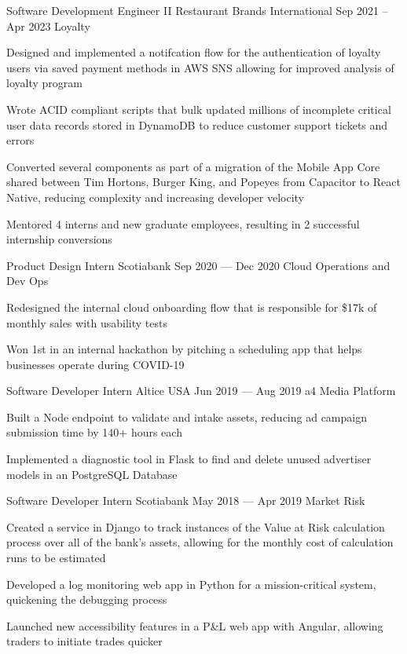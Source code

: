 \begin{cventries}
  \cventry
      {Software Development Engineer II}
      {Restaurant Brands International}
      {}
      {Sep 2021 -- Apr 2023}
      {Loyalty}
      {
        \begin{cvitems}
          \item {Designed and implemented a notifcation flow for the authentication of loyalty users via saved payment methods in AWS SNS allowing for improved analysis of loyalty program}
          \item {Wrote ACID compliant scripts that bulk updated millions of incomplete critical user data records stored in DynamoDB to reduce customer support tickets and errors}
          \item {Converted several components as part of a migration of the Mobile App Core shared between Tim Hortons, Burger King, and Popeyes from Capacitor to React Native, reducing complexity and increasing developer velocity}
          \item {Mentored 4 interns and new graduate employees, resulting in 2 successful internship conversions}
        \end{cvitems}
      }
  \cventry
    {Product Design Intern}
    {Scotiabank}
    {}
    {Sep 2020 --- Dec 2020}
    {Cloud Operations and Dev Ops}
    {
      \begin{cvitems}
        \item {Redesigned the internal cloud onboarding flow that is responsible for \$17k of monthly sales with usability tests}
        \item {Won 1st in an internal hackathon by pitching a scheduling app that helps businesses operate during COVID-19}
      \end{cvitems}
    }

  \cventry
    {Software Developer Intern}
    {Altice USA}
    {}
    {Jun 2019 --- Aug 2019}
    {a4 Media Platform}
    {
    \begin{cvitems}
      \item {Built a Node endpoint to validate and intake assets, reducing ad campaign submission time by 140+ hours each}
      \item {Implemented a diagnostic tool in Flask to find and delete unused advertiser models in an PostgreSQL Database}
    \end{cvitems}
    }

  \cventry
    {Software Developer Intern}
    {Scotiabank}
    {}
    {May 2018 --- Apr 2019}
    {Market Risk}
    {
      \begin{cvitems}
        \item {Created a service in Django to track instances of the Value at Risk calculation process over all of the bank's assets, allowing for the monthly cost of calculation runs to be estimated}
        \item {Developed a log monitoring web app in Python for a mission-critical system, quickening the debugging process}
        \item {Launched new accessibility features in a P\&L web app with Angular, allowing traders to initiate trades quicker}
      \end{cvitems}
    }
\end{cventries}
